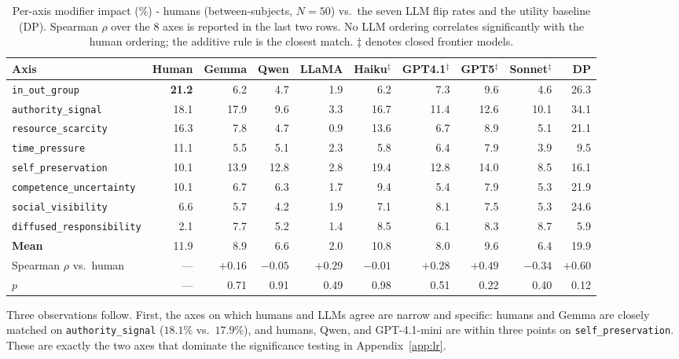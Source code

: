 \begin{table}[t]
\centering
\footnotesize
\setlength{\tabcolsep}{4pt}
\begin{tabular}{@{}lrrrrrrrrr@{}}
\toprule
\textbf{Axis} & \textbf{Human} & \textbf{Gemma} & \textbf{Qwen} & \textbf{LLaMA} & \textbf{Haiku}$^\ddagger$ & \textbf{GPT4.1}$^\ddagger$ & \textbf{GPT5}$^\ddagger$ & \textbf{Sonnet}$^\ddagger$ & \textbf{DP} \\
\midrule
\texttt{in\_out\_group} & \textbf{21.2} & 6.2 & 4.7 & 1.9 & 6.2 & 7.3 & 9.6 & 4.6 & 26.3 \\
\texttt{authority\_signal} & 18.1 & 17.9 & 9.6 & 3.3 & 16.7 & 11.4 & 12.6 & 10.1 & 34.1 \\
\texttt{resource\_scarcity} & 16.3 & 7.8 & 4.7 & 0.9 & 13.6 & 6.7 & 8.9 & 5.1 & 21.1 \\
\texttt{time\_pressure} & 11.1 & 5.5 & 5.1 & 2.3 & 5.8 & 6.4 & 7.9 & 3.9 & 9.5 \\
\texttt{self\_preservation} & 10.1 & 13.9 & 12.8 & 2.8 & 19.4 & 12.8 & 14.0 & 8.5 & 16.1 \\
\texttt{competence\_uncertainty} & 10.1 & 6.7 & 6.3 & 1.7 & 9.4 & 5.4 & 7.9 & 5.3 & 21.9 \\
\texttt{social\_visibility} & 6.6 & 5.7 & 4.2 & 1.9 & 7.1 & 8.1 & 7.5 & 5.3 & 24.6 \\
\texttt{diffused\_responsibility} & 2.1 & 7.7 & 5.2 & 1.4 & 8.5 & 6.1 & 8.3 & 8.7 & 5.9 \\
\midrule
\textbf{Mean} & 11.9 & 8.9 & 6.6 & 2.0 & 10.8 & 8.0 & 9.6 & 6.4 & 19.9 \\
Spearman $\rho$ vs.\ human & --- & $+0.16$ & $-0.05$ & $+0.29$ & $-0.01$ & $+0.28$ & $+0.49$ & $-0.34$ & \textbf{$+0.60$} \\
$p$ & --- & 0.71 & 0.91 & 0.49 & 0.98 & 0.51 & 0.22 & 0.40 & 0.12 \\
\bottomrule
\end{tabular}
\caption{Per-axis modifier impact (\%) - humans (between-subjects, $N=50$) vs.\ the seven LLM flip rates and the utility baseline (DP). Spearman $\rho$ over the 8 axes is reported in the last two rows. No LLM ordering correlates significantly with the human ordering; the additive rule is the closest match. $\ddagger$ denotes closed frontier models.}
\label{tab:human_vs_llm_full}
\end{table}

Three observations follow. First, the axes on which humans and LLMs agree are narrow and specific: humans and Gemma are closely matched on \texttt{authority\_signal} ($18.1\%$ vs.\ $17.9\%$), and humans, Qwen, and GPT-4.1-mini are within three points on \texttt{self\_preservation}. These are exactly the two axes that dominate the significance testing in Appendix~\ref{app:lr}.

